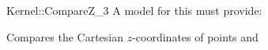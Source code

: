 \begin{ccRefFunctionObjectConcept}{Kernel::CompareZ_3}
A model for this must provide:


      {Compares the Cartesian $z$-coordinates of points  and
      }

\ccSeeAlso
{} \\

\end{ccRefFunctionObjectConcept}
